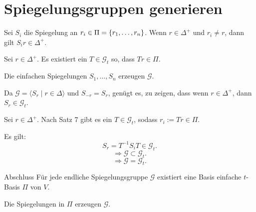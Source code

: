 \documentclass[18pt]{beamer}
\begin{document}
\section{Spiegelungsgruppen generieren}
\begin{frame}
    \begin{satz} %
        Sei \( S_i \) die Spiegelung an 
        \( r_i \in \Pi = \{r_1, \ldots, r_n\} \).
        Wenn \( r \in \Delta^+ \) und \( r_i \neq r \), 
        dann gilt \( S_i r \in \Delta^+ \).
    \end{satz}
    \pause
\end{frame}

\begin{frame}
    \begin{satz} %
        Sei \( r \in \Delta^+ \). Es existiert ein \( T \in 
        \mathscr{G}_t \) so, dass 
        \( Tr \in \Pi \).
    \end{satz}
\end{frame}

\begin{frame}
    \begin{satz} %
        Die einfachen Spiegelungen \( S_1, \ldots, S_n \) 
        erzeugen \( \mathscr{G} \).
    \end{satz}
    \pause
    \begin{bew}
        Da \( \mathscr{G} = \langle S_r \;\vert\; r \in \Delta \rangle \) 
        und \( S_{-r} = S_r \), genügt es, zu zeigen, dass wenn 
        \( r\in \Delta^+ \), dann \( S_r \in \mathscr{G}_t \).

        \pause
        Sei \( r \in \Delta^+ \). Nach Satz 7 gibt es 
        ein \( T \in \mathscr{G}_t \), sodass 
        \( r_i := Tr \in \Pi \).

        \pause
        Es gilt:
        \[ S_r = T^{-1} S_i T \in \mathscr{G}_t. \]
        \[ \Rightarrow \mathscr{G} \subset \mathscr{G}_t. \]
        \[ \Rightarrow \mathscr{G} = \mathscr{G}_t. \]
    \end{bew}
\end{frame}

\begin{frame}{Abschluss}
    Für jede endliche Spiegelungsgruppe 
    \( \mathscr{G} \) existiert eine Basis 
    einfache \( t \)-Basis \( \Pi \) 
    von \( V \). 
    \pause
    
    Die Spiegelungen in 
    \( \Pi \) erzeugen \( \mathscr{G} \).
\end{frame}
\end{document}
